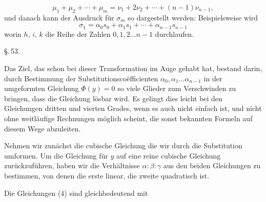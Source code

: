 
\[
\mu_1 + \mu_2 + \cdots + \mu_m = \nu_1 + 2\nu_2 + \cdots + (n-1)\nu_{n-1},
\]
und danach kann der Ausdruck für $\sigma_m$ so dargestellt werden:
Beispielsweise wird
\[
\sigma_1 = \alpha_0 s_0 + \alpha_1 s_1 + \cdots + \alpha_{n-1} s_{n-1}
\]
worin $h$, $i$, $k$ die Reihe der Zahlen $0, 1, 2 \ldots n-1$ durchlaufen.

\begin{center}
\S.\,53.

\end{center}

Das Ziel, das schon  bei dieser Transformation im Auge gehabt hat, bestand darin, durch Bestimmung der Substitutionsco\"efficienten $\alpha_0, \alpha_1 \ldots \alpha_{n-1}$ in der umgeformten Gleichung $\Phi(y) = 0$ so viele Glieder zum Verschwinden zu bringen, dass die Gleichung lösbar wird. Es gelingt dies leicht bei den Gleichungen dritten und vierten Grades, wenn es auch nicht einfach ist, und nicht ohne weitläufige Rechnungen möglich scheint, die sonst bekannten Formeln auf diesem Wege abzuleiten.

Nehmen wir zunächst die cubische Gleichung
die wir durch die Substitution
umformen. Um die Gleichung für $y$
auf eine reine cubische Gleichung zurückzuführen, haben wir die Verhältnisse $\alpha:\beta:\gamma$ aus den beiden Gleichungen
zu bestimmen, von denen die erste linear, die zweite quadratisch ist.

Die Gleichungen (4) sind gleichbedeutend mit
